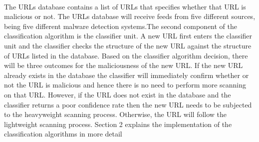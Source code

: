 

\paragraph{} 
The URLs database contains a list of URLs that specifies whether that URL is malicious or not. The URLs database will receive feeds from five different sources, being five different malware detection systems.The second component of the classification algorithm is the classifier unit. A new URL first enters the classifier unit and the classifier checks the structure of the new URL against the structure of URLs listed in the database. Based on the classifier algorithm decision, there will be three outcomes for the maliciousness of the new URL. If the new URL already exists in the database the classifier will immediately confirm whether or not the URL is malicious and hence there is no need to perform more scanning on that URL. However, if the URL does not exist in the database and the classifier returns a poor confidence rate then the new URL needs to be subjected to the heavyweight scanning process. Otherwise, the URL will follow the lightweight scanning process. Section 2 explains the implementation of the classification algorithms in more detail

